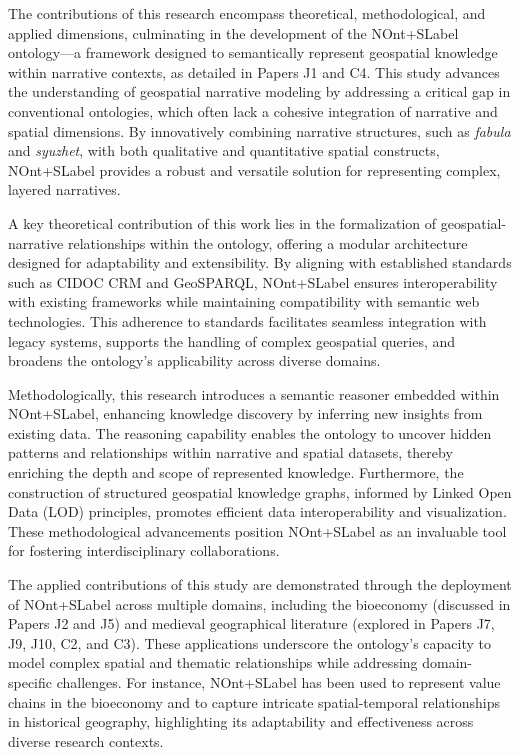 The contributions of this research encompass theoretical, methodological, and applied dimensions, culminating in the development of the \acrshort{NOnt+SLabel} ontology—a framework designed to semantically represent geospatial knowledge within narrative contexts, as detailed in Papers J1 and C4. This study advances the understanding of geospatial narrative modeling by addressing a critical gap in conventional ontologies, which often lack a cohesive integration of narrative and spatial dimensions. By innovatively combining narrative structures, such as \textit{fabula} and \textit{syuzhet}, with both qualitative and quantitative spatial constructs, \acrshort{NOnt+SLabel} provides a robust and versatile solution for representing complex, layered narratives.

A key theoretical contribution of this work lies in the formalization of geospatial-narrative relationships within the ontology, offering a modular architecture designed for adaptability and extensibility. By aligning with established standards such as CIDOC CRM and GeoSPARQL, \acrshort{NOnt+SLabel} ensures interoperability with existing frameworks while maintaining compatibility with semantic web technologies. This adherence to standards facilitates seamless integration with legacy systems, supports the handling of complex geospatial queries, and broadens the ontology's applicability across diverse domains.

Methodologically, this research introduces a semantic reasoner embedded within \acrshort{NOnt+SLabel}, enhancing knowledge discovery by inferring new insights from existing data. The reasoning capability enables the ontology to uncover hidden patterns and relationships within narrative and spatial datasets, thereby enriching the depth and scope of represented knowledge. Furthermore, the construction of structured geospatial knowledge graphs, informed by Linked Open Data (LOD) principles, promotes efficient data interoperability and visualization. These methodological advancements position \acrshort{NOnt+SLabel} as an invaluable tool for fostering interdisciplinary collaborations.

The applied contributions of this study are demonstrated through the deployment of \acrshort{NOnt+SLabel} across multiple domains, including the bioeconomy (discussed in Papers J2 and J5) and medieval geographical literature (explored in Papers J7, J9, J10, C2, and C3). These applications underscore the ontology’s capacity to model complex spatial and thematic relationships while addressing domain-specific challenges. For instance, \acrshort{NOnt+SLabel} has been used to represent value chains in the bioeconomy and to capture intricate spatial-temporal relationships in historical geography, highlighting its adaptability and effectiveness across diverse research contexts.

